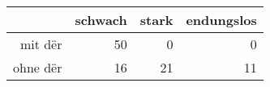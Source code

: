 \begin{tabular}{rrrr}
  \hline
 & schwach & stark & endungslos \\ 
  \hline
mit dër & 50 & 0 & 0 \\ 
  ohne dër & 16 & 21 & 11 \\ 
   \hline
\end{tabular}
